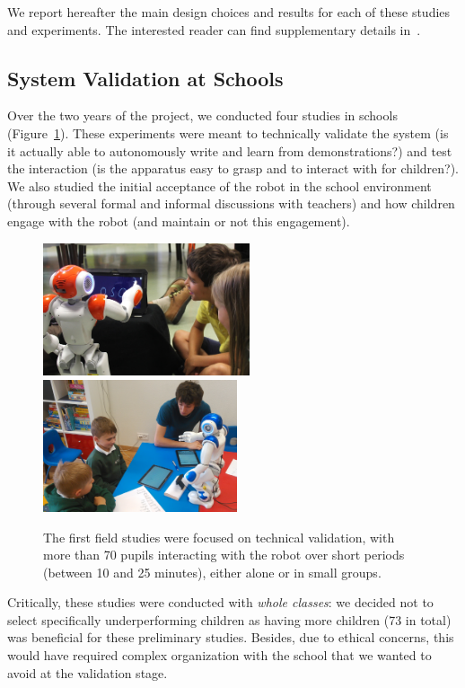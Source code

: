 \documentclass{article}
\begin{document}
We report hereafter the main design choices and results for each of these
studies and experiments. The interested reader can find supplementary details
in~\cite{jacq2016building, hood2015when}.

\subsection{System Validation at Schools}

Over the two years of the project, we conducted four studies in schools
(Figure~\ref{fig:schools}). These experiments were meant to technically validate
the system (is it actually able to autonomously write and learn from
demonstrations?) and test the interaction (is the apparatus easy to grasp and to
interact with for children?). We also studied the initial acceptance of the
robot in the school environment (through several formal and informal discussions
with teachers) and how children engage with the robot (and maintain or not this
engagement).

\begin{figure}
    \centering
    \includegraphics[height=3.9cm]{schools}
    \includegraphics[height=3.9cm]{schools2}
    \caption{\small The first field studies were focused on technical validation, with
    more than 70 pupils interacting with the robot over short periods (between
    10 and 25 minutes), either alone or in small groups.}
    \label{fig:schools}
\end{figure}

Critically, these studies were conducted with \emph{whole classes}: we decided
not to select specifically underperforming children as having more children (73
in total) was beneficial for these preliminary studies. Besides, due to ethical
concerns, this would have required complex organization with the school that we
wanted to avoid at the validation stage.
\end{document}
